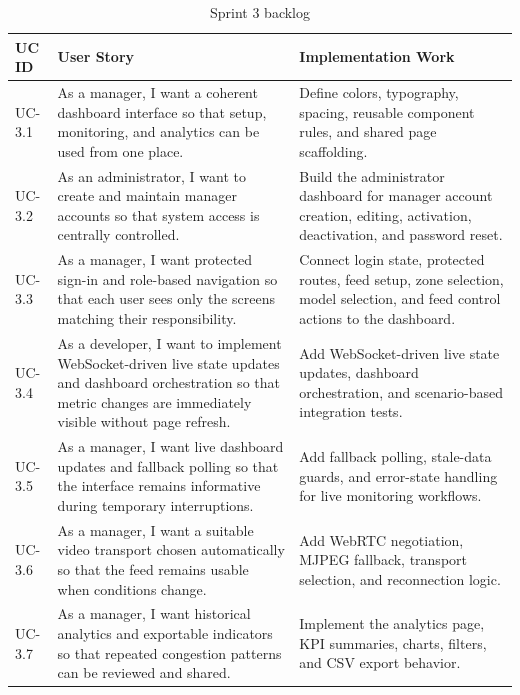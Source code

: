 \begin{table}[H]
    \centering
    \begingroup\setlength{\tabcolsep}{4pt}\renewcommand{\arraystretch}{0.95}\footnotesize
    \begin{tabularx}{\textwidth}{|l|X|X|}
        \hline
        UC ID & User Story & Implementation Work \\ \hline
        UC-3.1 & As a manager, I want a coherent dashboard interface so that setup, monitoring, and analytics can be used from one place. & Define colors, typography, spacing, reusable component rules, and shared page scaffolding. \\ \hline
        UC-3.2 & As an administrator, I want to create and maintain manager accounts so that system access is centrally controlled. & Build the administrator dashboard for manager account creation, editing, activation, deactivation, and password reset. \\ \hline
        UC-3.3 & As a manager, I want protected sign-in and role-based navigation so that each user sees only the screens matching their responsibility. & Connect login state, protected routes, feed setup, zone selection, model selection, and feed control actions to the dashboard. \\ \hline
        UC-3.4 & As a developer, I want to implement WebSocket-driven live state updates and dashboard orchestration so that metric changes are immediately visible without page refresh. & Add WebSocket-driven live state updates, dashboard orchestration, and scenario-based integration tests. \\ \hline
        UC-3.5 & As a manager, I want live dashboard updates and fallback polling so that the interface remains informative during temporary interruptions. & Add fallback polling, stale-data guards, and error-state handling for live monitoring workflows. \\ \hline
        UC-3.6 & As a manager, I want a suitable video transport chosen automatically so that the feed remains usable when conditions change. & Add WebRTC negotiation, MJPEG fallback, transport selection, and reconnection logic. \\ \hline
        UC-3.7 & As a manager, I want historical analytics and exportable indicators so that repeated congestion patterns can be reviewed and shared. & Implement the analytics page, KPI summaries, charts, filters, and CSV export behavior. \\ \hline
    \end{tabularx}
    \caption{Sprint 3 backlog}
    \label{tab:sprint3_backlog}
    \endgroup
\end{table}

